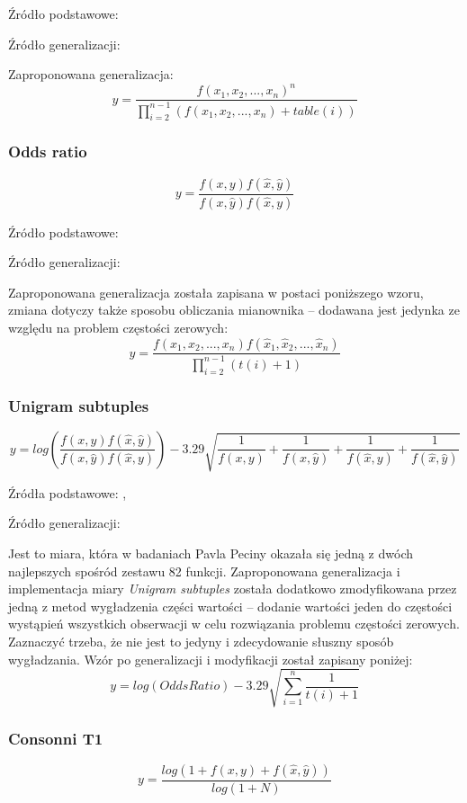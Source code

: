Źródło podstawowe: \cite[str. 4]{paradowski_beta}
\par
Źródło generalizacji: \cite{generalization_patterns}
\par
Zaproponowana generalizacja:
$$ y = \frac{f(x_{1}, x_{2}, ..., x_{n})^n}{\prod_{i=2}^{n - 1} (f(x_{1}, x_{2}, ..., x_{n}) + table(i))} $$

\subsubsection{Odds ratio}
$$ y = \frac{f(x, y)f(\hat{x}, \hat{y})}{f(x, \hat{y})f(\hat{x}, y)} $$

Źródło podstawowe: \cite[str. 18]{pecina_measures}
\par
Źródło generalizacji: \cite{generalization_patterns}
\par
Zaproponowana generalizacja została zapisana w postaci poniższego wzoru, zmiana dotyczy także sposobu obliczania mianownika -- dodawana jest jedynka ze względu na problem częstości zerowych:
$$ y = \frac{f(x_{1}, x_{2}, ..., x_{n})f(\hat{x}_{1}, \hat{x}_{2}, ..., \hat{x}_{n})}{\prod_{i = 2}^{n - 1}(t(i) + 1)} $$

\subsubsection{Unigram subtuples}
$$ y = log (\frac{f(x, y)f(\hat{x}, \hat{y})}{f(x, \hat{y})f(\hat{x}, y)}) - 3.29 \sqrt{ \frac{1}{f(x, y)} + \frac{1}{f(x, \hat{y})} + \frac{1}{f(\hat{x}, y)} + \frac{1}{f(\hat{x}, \hat{y})} } $$

Źródła podstawowe: \cite[str. 3]{coling}, \cite[str. 19]{pecina_measures}
\par
Źródło generalizacji: \cite{generalization_patterns}
\par
Jest to miara, która w badaniach Pavla Peciny \cite[str. 5]{coling} okazała się jedną z dwóch najlepszych spośród zestawu 82 funkcji.
Zaproponowana generalizacja i implementacja miary \emph{Unigram subtuples} została dodatkowo zmodyfikowana przez jedną z metod wygładzenia części wartości -- dodanie wartości jeden do częstości wystąpień wszystkich obserwacji w celu rozwiązania problemu częstości zerowych.
Zaznaczyć trzeba, że nie jest to jedyny i zdecydowanie słuszny sposób wygładzania.
Wzór po generalizacji i modyfikacji został zapisany poniżej:
$$ y = log (OddsRatio) - 3.29 \sqrt{\sum_{i=1}^{n} \frac{1}{t(i) + 1} } $$

\subsubsection{Consonni T1}
$$ y = \frac{log(1 + f(x, y) + f(\hat{x}, \hat{y}))}{log(1 + N)} $$

